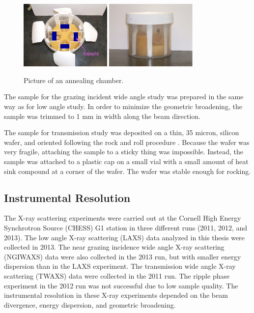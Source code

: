 \begin{figure}[htbp]
  \centering
  \includegraphics[width=0.4\textwidth]{figures/ripple/MMs/annealing_chamber_topview}
  \quad
  \includegraphics[width=0.4\textwidth]{figures/ripple/MMs/annealing_chamber_sideview}  
  \caption[Pictures of an annealing chamber]{Picture of an annealing chamber.}
  \label{fig:annealing_chamber}
\end{figure}

The sample for the grazing incident wide angle study was prepared in the same way 
as for low angle study. In order to minimize the geometric broadening, the 
sample was trimmed to 1 mm in width along the beam direction.

The sample for transmission study was deposited on a thin, 35 micron, silicon
wafer, and oriented following the rock and roll procedure \cite{Tristram-Nagle07_MMB}.  
Because the wafer was very fragile, attaching the sample to a sticky 
thing was impossible. Instead, the sample was attached to a plastic cap on 
a small vial with a small amount of heat sink compound at a corner of the 
wafer. The wafer was stable enough for rocking. 

\subsection{Instrumental Resolution}\label{sec:instrumental_resolution}
The X-ray scattering experiments were carried out at the Cornell 
High Energy Synchrotron Source (CHESS) G1 station in three different runs
(2011, 2012, and 2013). 
The low angle X-ray scattering (LAXS) data analyzed 
in this thesis were collected in 2013.
The near grazing incidence wide angle X-ray scattering (NGIWAXS) data were also collected
in the 2013 run, but with smaller energy dispersion than in the LAXS experiment.
The transmission wide angle X-ray scattering (TWAXS) data were collected
in the 2011 run. The ripple phase experiment in the 2012 run was not successful
due to low sample quality.
The instrumental resolution in these X-ray experiments depended on the beam
divergence, energy dispersion, and geometric broadening. 

